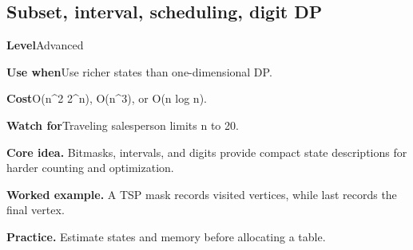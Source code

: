 \documentclass[10pt,letterpaper]{article}
\newcommand{\entrylabel}[1]{\textcolor{accent}{\bfseries #1}}
\begin{document}
\subsection{Subset, interval, scheduling, digit DP}
\begin{guidebox}\small
\entrylabel{Level}\quad Advanced\par
\entrylabel{Use when}\quad Use richer states than one-dimensional DP.\par
\entrylabel{Cost}\quad O(n\textasciicircum{}2 2\textasciicircum{}n), O(n\textasciicircum{}3), or O(n log n).\par
\entrylabel{Watch for}\quad Traveling salesperson limits n to 20.\par
\end{guidebox}
\noindent\textbf{Core idea.} Bitmasks, intervals, and digits provide compact state descriptions for harder counting and optimization.\par
\noindent\textbf{Worked example.} A TSP mask records visited vertices, while last records the final vertex.\par
\noindent\textbf{Practice.} Estimate states and memory before allocating a table.\par
\end{document}
